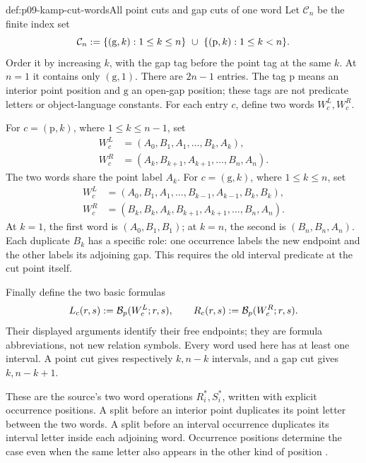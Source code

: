 \begin{hbdefinition}{def:p09-kamp-cut-words}{All point cuts and gap cuts of one word}
Let \(\mathcal C_n\) be the finite index set
\[
 \mathcal C_n\mathrel{:=}
 \{(\mathrm g,k):1\leq k\leq n\}\ \cup\
 \{(\mathrm p,k):1\leq k<n\}.
\]
Order it by increasing \(k\), with the gap tag before the point tag
at the same \(k\). At \(n=1\) it contains only \((\mathrm g,1)\).
There are \(2n-1\) entries. The tag \(\mathrm p\) means an
interior point position and \(\mathrm g\) an open-gap position;
these tags are not predicate letters or object-language constants.
For each entry \(c\), define two words \(W_c^L,W_c^R\).

For \(c=(\mathrm p,k)\), where \(1\leq k\leq n-1\), set
\[
\begin{aligned}
 W_c^L&=(A_0,B_1,A_1,\ldots,B_k,A_k),\\
 W_c^R&=(A_k,B_{k+1},A_{k+1},\ldots,B_n,A_n).
\end{aligned}
\]
The two words share the point label \(A_k\).
For \(c=(\mathrm g,k)\), where \(1\leq k\leq n\), set
\[
\begin{aligned}
 W_c^L&=(A_0,B_1,A_1,\ldots,B_{k-1},A_{k-1},B_k,B_k),\\
 W_c^R&=(B_k,B_k,A_k,B_{k+1},A_{k+1},\ldots,B_n,A_n).
\end{aligned}
\]
At \(k=1\), the first word is \((A_0,B_1,B_1)\); at \(k=n\),
the second is \((B_n,B_n,A_n)\). Each duplicate \(B_k\) has a
specific role: one occurrence labels the new endpoint and the other
labels its adjoining gap. This requires the old interval predicate at
the cut point itself.

Finally define the two basic formulas
\[
 L_c(r,s)\mathrel{:=}\mathcal B_p(W_c^L;r,s),\qquad
 R_c(r,s)\mathrel{:=}\mathcal B_p(W_c^R;r,s).
\]
Their displayed arguments identify their free endpoints; they are formula
abbreviations, not new relation symbols. Every word used here has at
least one interval. A point cut gives respectively \(k,n-k\)
intervals, and a gap cut gives \(k,n-k+1\).

These are the source's two word operations \(R_i^*,S_i^*\), written
with explicit occurrence positions. A split before an interior point
duplicates its point letter between the two words. A split before an
interval occurrence duplicates its interval letter inside each adjoining
word. Occurrence positions determine the case even when the same letter
also appears in the other kind of position
\cite[ch.~III, pp.~64, 81--82]{Kamp1968}.
\end{hbdefinition}

